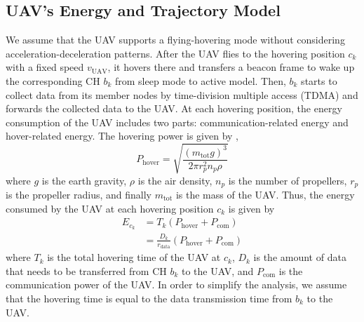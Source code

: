 \documentclass[journal]{IEEEtran}
\begin{document}
	\subsection{UAV's Energy and Trajectory Model}
	We assume that the UAV supports a flying-hovering mode without considering acceleration-deceleration patterns.  After the UAV flies to the hovering position $c_k$ with a fixed speed $v_{\text{UAV}}$, it hovers there and transfers a beacon frame to wake up the corresponding CH $b_k$ from sleep mode to active model. Then, $b_k$ starts to collect data from its member nodes by time-division multiple access (TDMA) and forwards the collected data to the UAV. At each hovering position, the energy consumption of the UAV includes two parts: communication-related energy and hover-related energy. The hovering power is given by \cite{M. B. Ghorbel}, \cite{D. Hulens}
	\begin{equation}
	    P_{\text{hover}} = \sqrt{\frac{\left(m_{\text{tot}}g\right)^3}{2 \pi r^2_{p}n_{p}\rho}}
	\end{equation}
	where $g$ is the earth gravity, $\rho$ is the air density, $n_p$ is the number of propellers, $r_p$ is the propeller radius, and finally $m_{\text{tot}}$ is the mass of the UAV. Thus, the energy consumed by the UAV at each hovering position $c_k$ is given by
	\begin{align}
	    E_{c_k} & = T_{k}(P_{\text{hover}} + P_{\text{com}}) \nonumber \\
	    & = \frac{D_k}{r_{\text{data}}}(P_{\text{hover}} + P_{\text{com}})
	\end{align}
	where $T_k$ is the total hovering time of the UAV at $c_k$, $D_k$ is the amount of data that needs to be transferred from CH $b_k$ to the UAV, and $P_{\text{com}}$ is the communication power of the UAV. In order to simplify the analysis, we assume that the hovering time is equal to the data transmission time from $b_k$ to the UAV.
	
\end{document}
